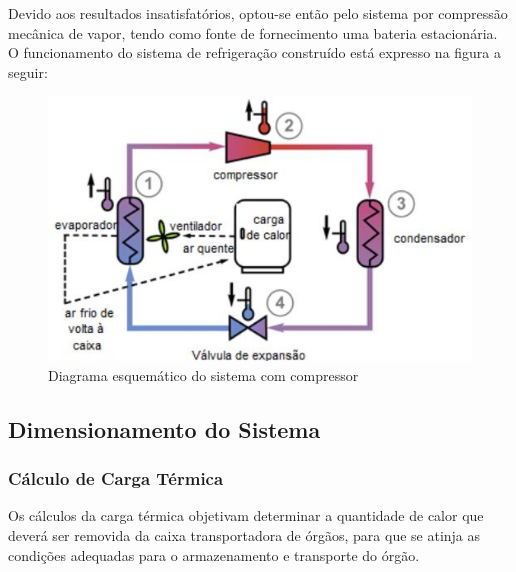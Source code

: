 	Devido aos resultados insatisfatórios, optou-se então pelo sistema por compressão mecânica de vapor, tendo como fonte de fornecimento uma bateria estacionária. O funcionamento do sistema de refrigeração construído está expresso na figura a seguir:
	\begin{figure}[H]
		\begin{center}
			\includegraphics[scale = 0.75]{figuras/esquematico_compressor.JPG}
			\caption{Diagrama esquemático do sistema com compressor}
		\end{center}
	\end{figure}
	
	\subsection{Dimensionamento do Sistema}
		\subsubsection{Cálculo de Carga Térmica}
		Os cálculos da carga térmica objetivam determinar a quantidade de calor que deverá ser removida da caixa transportadora de órgãos, para que se atinja as condições adequadas para o armazenamento e transporte do órgão.
		
